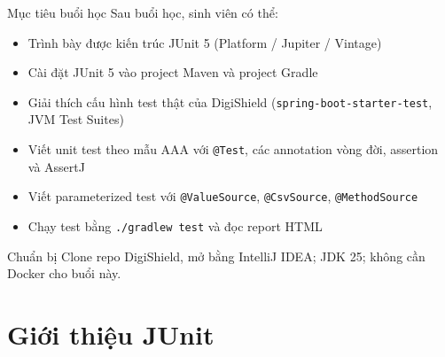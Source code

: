 \documentclass[aspectratio=169,12pt]{beamer}
\begin{document}
\begin{frame}{Mục tiêu buổi học}
  Sau buổi học, sinh viên có thể:
  \begin{itemize}
    \item Trình bày được kiến trúc JUnit 5 (Platform / Jupiter / Vintage)
    \item Cài đặt JUnit 5 vào project Maven và project Gradle
    \item Giải thích cấu hình test thật của DigiShield
          (\texttt{spring-boot-starter-test}, JVM Test Suites)
    \item Viết unit test theo mẫu AAA với \texttt{@Test},
          các annotation vòng đời, assertion và AssertJ
    \item Viết parameterized test với \texttt{@ValueSource},
          \texttt{@CsvSource}, \texttt{@MethodSource}
    \item Chạy test bằng \texttt{./gradlew test} và đọc report HTML
  \end{itemize}

  \vspace{0.4em}
  \begin{alertblock}{Chuẩn bị}
    Clone repo DigiShield, mở bằng IntelliJ IDEA; JDK 25;
    không cần Docker cho buổi này.
  \end{alertblock}
\end{frame}

\section{Giới thiệu JUnit}
\end{document}
